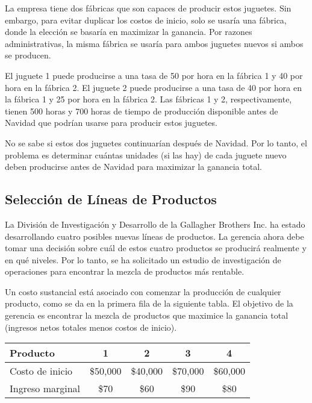 \documentclass[12pt]{article}
\begin{document}
\vspace{0.5em}

La empresa tiene dos fábricas que son capaces de producir estos juguetes. Sin embargo, para evitar duplicar los costos de inicio, solo se usaría una fábrica, donde la elección se basaría en maximizar la ganancia. Por razones administrativas, la misma fábrica se usaría para ambos juguetes nuevos si ambos se producen.

\vspace{0.5em}

El juguete 1 puede producirse a una tasa de 50 por hora en la fábrica 1 y 40 por hora en la fábrica 2. El juguete 2 puede producirse a una tasa de 40 por hora en la fábrica 1 y 25 por hora en la fábrica 2. Las fábricas 1 y 2, respectivamente, tienen 500 horas y 700 horas de tiempo de producción disponible antes de Navidad que podrían usarse para producir estos juguetes.

\vspace{0.5em}

No se sabe si estos dos juguetes continuarían después de Navidad. Por lo tanto, el problema es determinar cuántas unidades (si las hay) de cada juguete nuevo deben producirse antes de Navidad para maximizar la ganancia total.

\subsection{Selección de Líneas de Productos}
La División de Investigación y Desarrollo de la Gallagher Brothers Inc. ha estado desarrollando cuatro posibles nuevas líneas de productos. La gerencia ahora debe tomar una decisión sobre cuál de estos cuatro productos se producirá realmente y en qué niveles. Por lo tanto, se ha solicitado un estudio de investigación de operaciones para encontrar la mezcla de productos más rentable.

\vspace{0.5em}

Un costo sustancial está asociado con comenzar la producción de cualquier producto, como se da en la primera fila de la siguiente tabla. El objetivo de la gerencia es encontrar la mezcla de productos que maximice la ganancia total (ingresos netos totales menos costos de inicio).

\begin{table}[h]
\centering
\begin{tabular}{lcccc}
\toprule
\textbf{Producto} & 1 & 2 & 3 & 4 \\
\midrule
Costo de inicio & \$50,000 & \$40,000 & \$70,000 & \$60,000 \\
Ingreso marginal & \$70 & \$60 & \$90 & \$80 \\
\bottomrule
\end{tabular}
\end{table}
\end{document}
